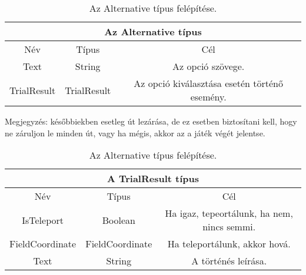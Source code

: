 \begin{table}[H]
	\centering
	\begin{tabular}{ |c|c|c| }
		\hline
		\multicolumn{3}{|c|}{Az Alternative típus}\\
		\hline
		Név & Típus & Cél \\
		\hline
		Text  & String  & Az opció szövege.  \\
		\hline
		TrialResult & TrialResult & Az opció kiválasztása esetén történő esemény.\\
		\hline
	\end{tabular}
	\caption[Alternative típus]{Az Alternative típus felépítése.}
	\label{tab:alternative}
\end{table}

Megjegyzés: későbbiekben esetleg út lezárása, de ez esetben biztosítani kell, hogy ne záruljon le minden út, vagy ha mégis, akkor az a játék végét jelentse.

\begin{table}[H]
	\centering
	\begin{tabular}{ |c|c|c| }
		\hline
		\multicolumn{3}{|c|}{A TrialResult típus}\\
		\hline
		Név & Típus & Cél \\
		\hline
		IsTeleport  & Boolean  & Ha igaz, tepeortálunk, ha nem, nincs semmi.  \\
		\hline
		FieldCoordinate & FieldCoordinate & Ha teleportálunk, akkor hová.\\
		\hline
		Text & String & A történés leírása. \\
		\hline
	\end{tabular}
	\caption[Alternative típus]{Az Alternative típus felépítése.}
	\label{tab:alternative}
\end{table}

